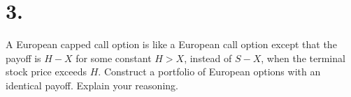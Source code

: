 \documentclass{article}
\begin{document}
\section*{3.}
{\Large 

A European capped call option is like a European call option except that the payoff is $H - X$ for some constant $H > X$, instead of $S - X$, when the terminal stock price exceeds $H$.  Construct a portfolio of European options with an identical payoff. Explain your reasoning.   

}
\end{document}
